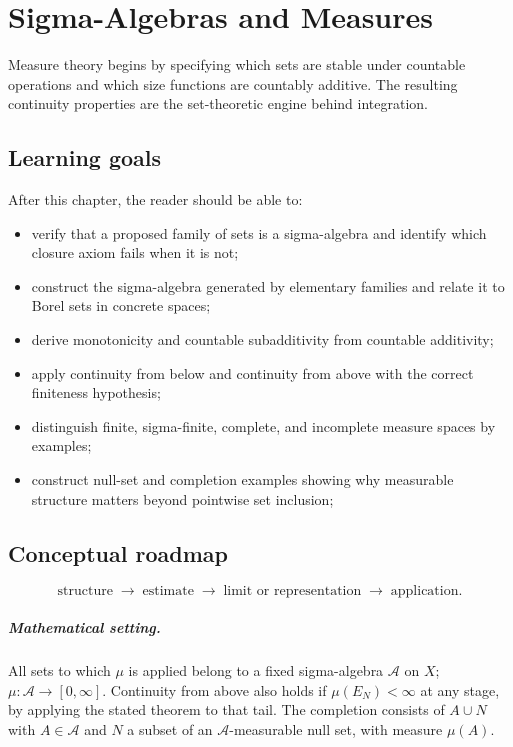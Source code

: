 \chapter{Sigma-Algebras and Measures}
\label{ch:iii01}

Measure theory begins by specifying which sets are stable under countable operations and which size functions are countably additive. The resulting continuity properties are the set-theoretic engine behind integration.

\section*{Learning goals}
After this chapter, the reader should be able to:
\begin{itemize}
\item verify that a proposed family of sets is a sigma-algebra and identify which closure axiom fails when it is not;
\item construct the sigma-algebra generated by elementary families and relate it to Borel sets in concrete spaces;
\item derive monotonicity and countable subadditivity from countable additivity;
\item apply continuity from below and continuity from above with the correct finiteness hypothesis;
\item distinguish finite, sigma-finite, complete, and incomplete measure spaces by examples;
\item construct null-set and completion examples showing why measurable structure matters beyond pointwise set inclusion;
\end{itemize}
\section*{Conceptual roadmap}
\[
\boxed{\text{structure}\;\longrightarrow\;\text{estimate}\;\longrightarrow\;\text{limit or representation}\;\longrightarrow\;\text{application}.}
\]

\paragraph{Mathematical setting.}
All sets to which $\mu$ is applied belong to a fixed sigma-algebra $\mathcal A$ on $X$; $\mu:\mathcal A\to[0,\infty]$. Continuity from above also holds if $\mu(E_N)<\infty$ at any stage, by applying the stated theorem to that tail. The completion consists of $A\cup N$ with $A\in\mathcal A$ and $N$ a subset of an $\mathcal A$-measurable null set, with measure $\mu(A)$.

